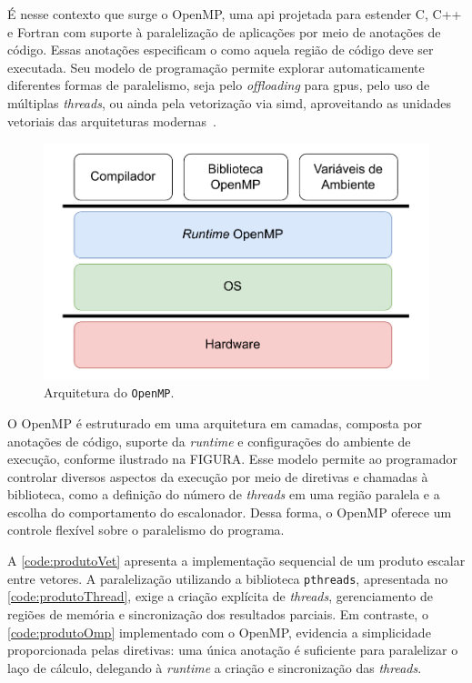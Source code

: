 É nesse contexto que surge o OpenMP, uma \gls{api} projetada para estender C, C++ e Fortran com suporte à paralelização de aplicações por meio de anotações de código. Essas anotações especificam o como aquela região de código deve ser executada. Seu modelo de programação permite explorar automaticamente diferentes formas de paralelismo, seja pelo \textit{offloading} para \glspl{gpu}, pelo uso de múltiplas \textit{threads}, ou ainda pela vetorização via \gls{simd}, aproveitando as unidades vetoriais das arquiteturas modernas~\cite{mattson2019}.

\begin{figure}[htb]
    \caption{Arquitetura do \texttt{OpenMP}.}
    \label{fig:ompArchitecture}
    \includegraphics[scale=0.7]{Figuras/omp_architecture.pdf}
    \fonte{}
\end{figure}

O OpenMP é estruturado em uma arquitetura em camadas, composta por anotações de código, suporte da \textit{runtime} e configurações do ambiente de execução, conforme ilustrado na FIGURA. Esse modelo permite ao programador controlar diversos aspectos da execução por meio de diretivas e chamadas à biblioteca, como a definição do número de \textit{threads} em uma região paralela e a escolha do comportamento do escalonador. Dessa forma, o OpenMP oferece um controle flexível sobre o paralelismo do programa.

A \autoref{code:produtoVet} apresenta a implementação sequencial de um produto escalar entre vetores. A paralelização utilizando a biblioteca \texttt{pthreads}, apresentada no \autoref{code:produtoThread}, exige a criação explícita de \textit{threads}, gerenciamento de regiões de memória e sincronização dos resultados parciais. Em contraste, o \autoref{code:produtoOmp} implementado com o OpenMP, evidencia a simplicidade proporcionada pelas diretivas: uma única anotação é suficiente para paralelizar o laço de cálculo, delegando à \textit{runtime} a criação e sincronização das \textit{threads}.

